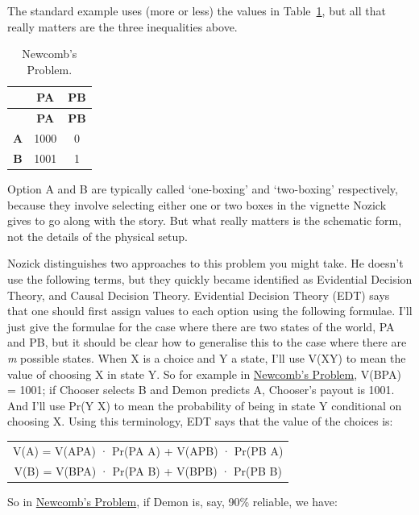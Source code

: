 \documentclass[
  12pt,
  letterpaper,
  DIV=11,
  numbers=noendperiod]{scrreprt}
\begin{document}
The standard example uses (more or less) the values in
Table~\ref{tbl-newcomb}, but all that really matters are the three
inequalities above.

\begin{longtable}[]{@{}ccc@{}}
\caption{Newcomb's Problem.}\label{tbl-newcomb}\tabularnewline
\toprule\noalign{}
& \textbf{PA} & \textbf{PB} \\
\midrule\noalign{}
\endfirsthead
\toprule\noalign{}
& \textbf{PA} & \textbf{PB} \\
\midrule\noalign{}
\endhead
\bottomrule\noalign{}
\endlastfoot
\textbf{A} & 1000 & 0 \\
\textbf{B} & 1001 & 1 \\
\end{longtable}

Option A and B are typically called `one-boxing' and `two-boxing'
respectively, because they involve selecting either one or two boxes in
the vignette Nozick gives to go along with the story. But what really
matters is the schematic form, not the details of the physical setup.

Nozick distinguishes two approaches to this problem you might take. He
doesn't use the following terms, but they quickly became identified as
Evidential Decision Theory, and Causal Decision Theory. Evidential
Decision Theory (EDT) says that one should first assign values to each
option using the following formulae. I'll just give the formulae for the
case where there are two states of the world, PA and PB, but it should
be clear how to generalise this to the case where there are \emph{m}
possible states. When X is a choice and Y a state, I'll use V(XY) to
mean the value of choosing X in state Y. So for example in
\hyperref[tbl-newcomb]{Newcomb's Problem}, V(BPA) = 1001; if Chooser
selects B and Demon predicts A, Chooser's payout is 1001. And I'll use
Pr(Y \textbar{} X) to mean the probability of being in state Y
conditional on choosing X. Using this terminology, EDT says that the
value of the choices is:

\begin{longtable}[]{@{}c@{}}
\toprule\noalign{}
\endhead
\bottomrule\noalign{}
\endlastfoot
V(A) = V(APA) · Pr(PA \textbar{} A) + V(APB) · Pr(PB \textbar{} A) \\
V(B) = V(BPA) · Pr(PA \textbar{} B) + V(BPB) · Pr(PB \textbar{} B) \\
\end{longtable}

So in \hyperref[tbl-newcomb]{Newcomb's Problem}, if Demon is, say, 90\%
reliable, we have:
\end{document}
